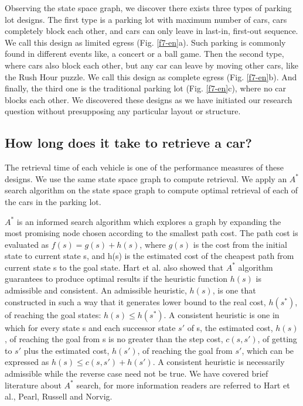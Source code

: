 Observing the state space graph, we discover there exists three types of parking lot designs. The first type is a parking lot with maximum number of cars, cars completely block each other, and cars can only leave in last-in, first-out sequence. We call this design as limited egress (Fig. \ref{f7-en}a). Such parking is commonly found in different events like, a concert or a ball game. Then the second type, where cars also block each other, but any car can leave by moving other cars, like the Rush Hour puzzle. We call this design as complete egress (Fig. \ref{f7-en}b). And finally, the third one is the traditional parking lot (Fig. \ref{f7-en}c), where no car blocks each other. We discovered these designs as we have initiated our research question without presupposing any particular layout or structure.

\subsection{How long does it take to retrieve a car?}

The retrieval time of each vehicle is one of the performance measures of these designs. We use the same state space graph to compute retrieval. We apply an $A^*$ search algorithm on the state space graph to compute optimal retrieval of each of the cars in the parking lot.

$A^*$ is an informed search algorithm which explores a graph by expanding the most promising node chosen according to the smallest path cost. The path cost is evaluated as $f(s) = g(s) + h(s)$, where $g(s)$ is the cost from the initial state to current state s, and h(s) is the estimated cost of the cheapest path from current state s to the goal state. Hart et al. also showed that $A^*$ algorithm guarantees to produce optimal results if the heuristic function $h(s)$ is admissible and consistent. An admissible heuristic, $h(s)$, is one that constructed in such a way that it generates lower bound to the real cost, $h(s^*)$, of reaching the goal states: $h(s)\le h(s^*)$. A consistent heuristic is one in which for every state s and each successor state $s'$ of s, the estimated cost, $h(s)$, of reaching the goal from s is no greater than the step cost, $c(s,s')$, of getting to $s'$ plus the estimated cost, $h(s')$, of reaching the goal from $s'$, which can be expressed as $h(s)\le c(s, s') + h(s')$. A consistent heuristic is necessarily admissible while the reverse case need not be true. We have covered brief literature about $A^*$ search, for more information readers are referred to Hart et al., Pearl, Russell and Norvig.

